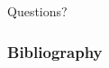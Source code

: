 \documentclass{beamer}
\begin{document}

\begin{frame}
\Huge{\centerline{Questions?}}
\end{frame}

\begin{frame}
\frametitle{Bibliography}
{}

\end{frame}
\end{document}
